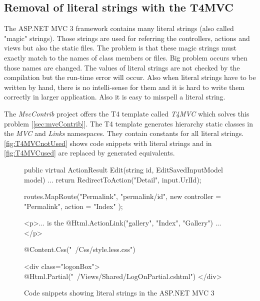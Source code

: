 \subsection{Removal of literal strings with the T4MVC}
\label{sec:implT4mvc}

The ASP.NET MVC 3 framework contains many literal strings (also called "magic" strings).
Those strings are used for referring the controllers, actions and views but also the static files.
The problem is that these magic strings must exactly match to the names of class members or files.
Big problem occurs when those names are changed.
The values of literal strings are not checked by the compilation but the run-time error will occur.
Also when literal strings have to be written by hand, there is no intelli-sense for them and it is hard to write them correctly in larger application.
Also it is easy to misspell a literal string.

The \emph{MvcContrib} project offers the T4 template called \emph{T4MVC} which solves this problem [\ref{sec:mvcContrib}].
The T4 template generates hierarchy static classes in the \emph{MVC} and \emph{Links} namespaces.
They contain constants for all literal strings.
\autoref{fig:T4MVCnotUsed} shows code snippets with literal strings and in \autoref{fig:T4MVCused} are replaced by generated equivalents.

\begin{figure}[h!]
	\begin{Csharp}
public virtual ActionResult Edit(string id, EditSavedInputModel model) {
	...
	return RedirectToAction("Detail", input.UrlId);
}
	\end{Csharp}
	
	\begin{Csharp}
routes.MapRoute("Permalink",
	"permalink/{id}",
	new { controller = "Permalink", action = "Index" }
);
	\end{Csharp}
	
	\begin{Razor}
<p>... is the @Html.ActionLink("gallery", "Index", "Gallery") ...</p>
	\end{Razor}
	
	\begin{Razor}
@Content.Css("~/Css/style.less.css")
	\end{Razor}
	
	\begin{Razor}
<div class="logonBox">
	@Html.Partial("~/Views/Shared/LogOnPartial.cshtml")
</div>
	\end{Razor}
	
	\caption{Code snippets showing literal strings in the ASP.NET MVC 3}
	\label{fig:T4MVCnotUsed}
\end{figure}



